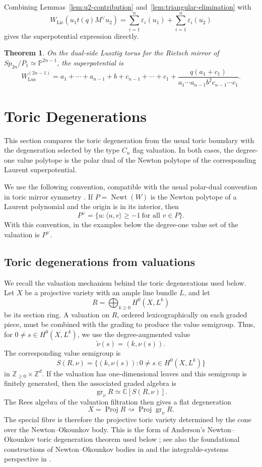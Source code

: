 \documentclass{article}
\newtheorem{thm}{Theorem}[section]
\newcommand{\ZZ}{\mathbb{Z}}
\newcommand{\CC}{\mathbb{C}}
\newcommand{\PP}{\mathbb{P}}
\begin{document}
Combining Lemmas~\ref{lem:u2-contribution} and~\ref{lem:triangular-elimination} with
\[
W_{\mathrm{Lie}}(u_1t(q)M^\vee u_2)
=
\sum_{i=1}^n\varepsilon_i(u_1)
+
\sum_{i=1}^n\varepsilon_i(u_2)
\]
gives the superpotential expression directly.

\begin{thm}\label{thm:lusztig-potential}
On the dual-side Lusztig torus for the Rietsch mirror of \(Sp_{2n}/P_1\simeq\PP^{2n-1}\), the superpotential is
\[
W_{\mathrm{Lus}}^{(2n-1)}
=a_1+\cdots+a_{n-1}+b+c_{n-1}+\cdots+c_1
+\frac{q(a_1+c_1)}{a_1\cdots a_{n-1}b^2c_{n-1}\cdots c_1}.
\]
\end{thm}


\section{Toric Degenerations}
This section compares the toric degeneration from the usual toric boundary with the degeneration selected by the type \(C_n\) flag valuation. In both cases, the degree-one value polytope is the polar dual of the Newton polytope of the corresponding Laurent superpotential.

We use the following convention, compatible with the usual polar-dual convention in toric mirror symmetry \cite{Bat94}. If \(P=\operatorname{Newt}(W)\) is the Newton polytope of a Laurent polynomial and the origin is in its interior, then
\[
P^\vee=\{u:\langle u,v\rangle\ge -1\ \text{for all }v\in P\}.
\]
With this convention, in the examples below the degree-one value set of the valuation is \(P^\vee\).

\subsection{Toric degenerations from valuations}
We recall the valuation mechanism behind the toric degenerations used below. Let \(X\) be a projective variety with an ample line bundle \(L\), and let
\[
R=\bigoplus_{k\ge0}H^0(X,L^k)
\]
be its section ring. A valuation on \(R\), ordered lexicographically on each graded piece, must be combined with the grading to produce the value semigroup. Thus, for \(0\ne s\in H^0(X,L^k)\), we use the degree-augmented value
\[
\widetilde\nu(s)=(k,\nu(s)).
\]
The corresponding value semigroup is
\[
S(R,\nu)=\{(k,\nu(s)):0\ne s\in H^0(X,L^k)\}
\]
in \(\ZZ_{\ge0}\times\ZZ^d\). If the valuation has one-dimensional leaves and this semigroup is finitely generated, then the associated graded algebra is
\[
\operatorname{gr}_\nu R\simeq \CC[S(R,\nu)].
\]
The Rees algebra of the valuation filtration then gives a flat degeneration
\[
X=\operatorname{Proj}R\rightsquigarrow \operatorname{Proj}\operatorname{gr}_\nu R.
\]
The special fibre is therefore the projective toric variety determined by the cone over the Newton--Okounkov body. This is the form of Anderson's Newton--Okounkov toric degeneration theorem used below \cite{Anderson}; see also the foundational constructions of Newton--Okounkov bodies in \cite{KK,LM} and the integrable-systems perspective in \cite{HK}.
\end{document}
